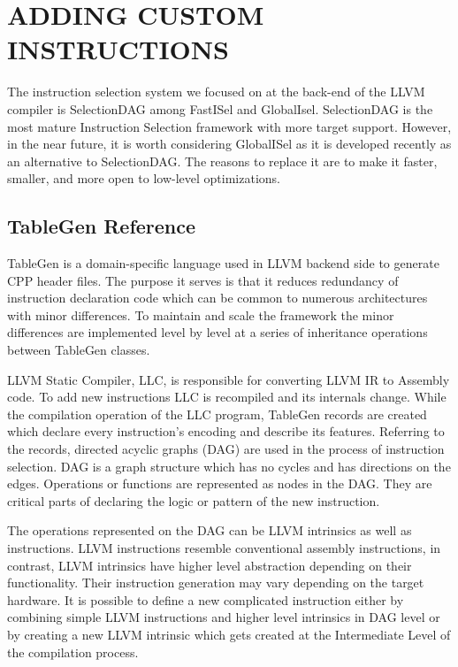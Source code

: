 \clearpage
\chapter{ADDING CUSTOM INSTRUCTIONS}\label{ch:custom_instr}
The instruction selection system we focused on at the back-end of the LLVM compiler is SelectionDAG among FastISel and GlobalIsel. SelectionDAG is the most mature Instruction Selection framework with more target support. However, in the near future, it is worth considering GlobalISel as it is developed recently as an alternative to SelectionDAG. The reasons to replace it are to make it faster, smaller, and more open to low-level optimizations.
\section{TableGen Reference}
TableGen is a domain-specific language used in LLVM backend side to generate CPP header files. The purpose it serves is that it reduces redundancy of instruction declaration code which can be common to numerous architectures with minor differences. To maintain and scale the framework the minor differences are implemented level by level at a series of inheritance operations between TableGen classes. 

\par
 LLVM Static Compiler, LLC, is responsible for converting LLVM IR to Assembly code. To add new instructions LLC is recompiled and its internals change. While the compilation operation of the LLC program, TableGen records are created which declare every instruction’s encoding and describe its features. Referring to the records, directed acyclic graphs (DAG) are used in the process of instruction selection. DAG is a graph structure which has no cycles and has directions on the edges. Operations or functions are represented as nodes in the DAG. They are critical parts of declaring the logic or pattern of the new instruction. 
\par

The operations represented on the DAG can be LLVM intrinsics as well as instructions. LLVM instructions resemble conventional assembly instructions, in contrast, LLVM intrinsics have higher level abstraction depending on their functionality. Their instruction generation may vary depending on the target hardware. It is possible to define a new complicated instruction either by combining simple LLVM instructions and higher level intrinsics in DAG level or by creating a new LLVM intrinsic which gets created at the Intermediate Level of the compilation process.

